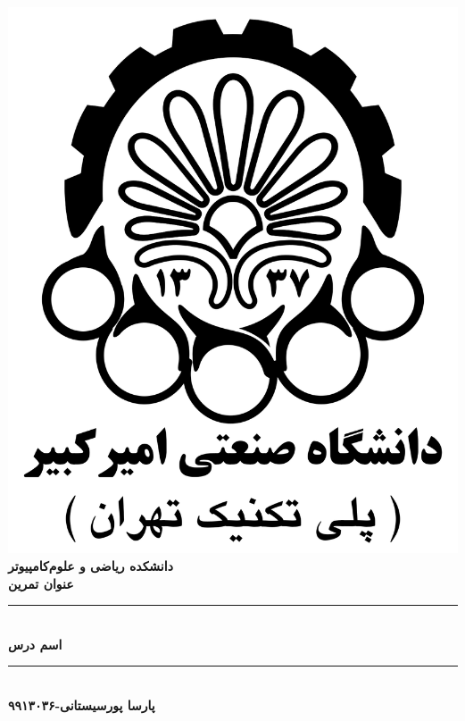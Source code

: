 \documentclass[]{article}
\author{پارسا پورسیستانی-۹۹۱۳۰۳۶}
\begin{document}
\begin{titlepage}
\newcommand{\HRule}{\rule{\linewidth}{0.5mm}} 
\newcommand{\itab}[1]{\hspace{0em}\rlap{#1}}

\center 

\includegraphics[scale=0.15]{logo2.png}\\[1cm]
\textsc{\LARGE \bfseries دانشکده ریاضی و علوم‌کامپیوتر}\\[0.7cm] 
\textsc{\Large \bfseries عنوان تمرین}\\[0.5cm] 
\HRule \\[0.4cm]
{ \huge \bfseries اسم درس}\\[0.4cm]
\HRule \\[1cm]
\textsc{\LARGE \bfseries پارسا پورسیستانی-۹۹۱۳۰۳۶}\\[0.7cm]
\end{titlepage}
\newpage
{}
  
\end{document}

